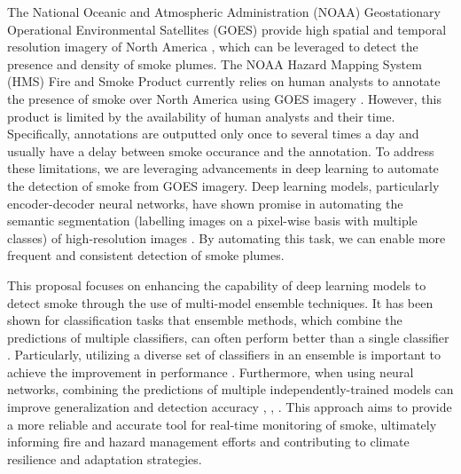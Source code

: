\documentclass{article}
\begin{document}
The National Oceanic and Atmospheric Administration (NOAA) Geostationary Operational Environmental Satellites (GOES) provide high spatial and temporal resolution imagery of North America \citep{GOESbook}, which can be leveraged to detect the presence and density of smoke plumes. The NOAA Hazard Mapping System (HMS) Fire and Smoke Product currently relies on human analysts to annotate the presence of smoke over North America using GOES imagery \citep{hms}. However, this product is limited by the availability of human analysts and their time. Specifically, annotations are outputted only once to several times a day and usually have a delay between smoke occurance and the annotation. To address these limitations, we are leveraging advancements in deep learning to automate  the detection of smoke from GOES imagery. Deep learning models, particularly encoder-decoder neural networks, have shown promise in automating the semantic segmentation (labelling images on a pixel-wise basis with multiple classes) of high-resolution images \citep{cv-segmentation-review}. By automating this task, we can enable more frequent and consistent detection of smoke plumes.

This proposal focuses on enhancing the capability of deep learning models to detect smoke through the use of multi-model ensemble techniques. It has been shown for classification tasks that ensemble methods, which combine the predictions of multiple classifiers, can often perform better than a single classifier \citep{ensemble-ml}. Particularly, utilizing a diverse set of classifiers in an ensemble is important to achieve the improvement in performance \citep{ensemble-diversity}. Furthermore, when using neural networks, combining the predictions of multiple independently-trained models can improve generalization and detection accuracy \citep{nn-ensemble}, \citep{nn-ensemble2}, \citep{nn-error-ens}. This approach aims to provide a more reliable and accurate tool for real-time monitoring of smoke, ultimately informing fire and hazard management efforts and contributing to climate resilience and adaptation strategies.

\end{document}
